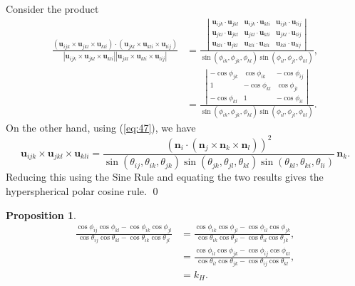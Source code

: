 \documentclass[fleqn,11pt,twoside]{article}
\makeatletter
\renewenvironment{proof}[1][\proofname]{\par
  \normalfont
  \topsep6\p@\@plus6\p@ \trivlist
  \item[\hskip\labelsep\textbf{%
    #1\@addpunct{.}}]\ignorespaces
}{%
  \qed\endtrivlist
}
\theoremstyle{definition}
\newtheorem{prop}{Proposition}
\makeatother
\begin{document}
\begin{proof}
Consider the product
\begin{equation}
\begin{split}
\frac{(\textbf{u}_{ijk}\times\textbf{u}_{jkl}\times\textbf{u}_{kli})\cdot(\textbf{u}_{jkl}\times\textbf{u}_{kli}\times\textbf{u}_{lij})}
{|\textbf{u}_{ijk}\times\textbf{u}_{jkl}\times\textbf{u}_{kli}||\textbf{u}_{jkl}\times\textbf{u}_{kli}\times\textbf{u}_{lij}|}&=
\frac{\left|\begin{array}{ccc}
\textbf{u}_{ijk}\cdot\textbf{u}_{jkl} &
\textbf{u}_{ijk}\cdot\textbf{u}_{kli} &
\textbf{u}_{ijk}\cdot\textbf{u}_{lij} \\
\textbf{u}_{jkl}\cdot\textbf{u}_{jkl} &
\textbf{u}_{jkl}\cdot\textbf{u}_{kli} &
\textbf{u}_{jkl}\cdot\textbf{u}_{lij} \\
\textbf{u}_{kli}\cdot\textbf{u}_{jkl} &
\textbf{u}_{kli}\cdot\textbf{u}_{kli} &
\textbf{u}_{kli}\cdot\textbf{u}_{lij} 
\end{array}\right|}
{\sin(\phi_{ik},\phi_{jk},\phi_{kl})\sin(\phi_{il},\phi_{jl},\phi_{kl})},\\
&=
\frac{\left|\begin{array}{ccc}
-\cos\phi_{jk} &
\cos\phi_{ik} &
-\cos\phi_{ij} \\
1 &
-\cos\phi_{kl} &
\cos\phi_{jl} \\
-\cos\phi_{kl} &
1 &
-\cos\phi_{il} 
\end{array}\right|}
{\sin(\phi_{ik},\phi_{jk},\phi_{kl})\sin(\phi_{il},\phi_{jl},\phi_{kl})}.
\end{split}
\end{equation}
On the other hand, using (\ref{eq:47}), we have
\begin{equation}
\textbf{u}_{ijk}\times\textbf{u}_{jkl}\times\textbf{u}_{kli}=\frac{\left(\textbf{n}_i\cdot(\textbf{n}_j\times\textbf{n}_k\times\textbf{n}_l)\right)^2}{\sin(\theta_{ij},\theta_{ik},\theta_{jk})\sin(\theta_{jk},\theta_{jl},\theta_{kl})\sin(\theta_{kl},\theta_{ki},\theta_{li})}\,\textbf{n}_k.
\end{equation}
Reducing this using the Sine Rule and equating the two results gives the hyperspherical polar cosine rule.
\end{proof}

\begin{prop}
\begin{equation}
\begin{split}
\frac{\cos\phi_{ij}\cos\phi_{kl}-\cos\phi_{ik}\cos\phi_{jl}}{\cos\theta_{ij}\cos\theta_{kl}-\cos\theta_{ik}\cos\theta_{jl}}&=\frac{\cos\phi_{ik}\cos\phi_{jl}-\cos\phi_{il}\cos\phi_{jk}}{\cos\theta_{ik}\cos\theta_{jl}-\cos\theta_{il}\cos\theta_{jk}},\\
&=\frac{\cos\phi_{il}\cos\phi_{jk}-\cos\phi_{ij}\cos\phi_{kl}}{\cos\theta_{il}\cos\theta_{jk}-\cos\theta_{ij}\cos\theta_{kl}},\\
&=k_H.
\end{split}
\end{equation}
\end{prop}
\end{document}

